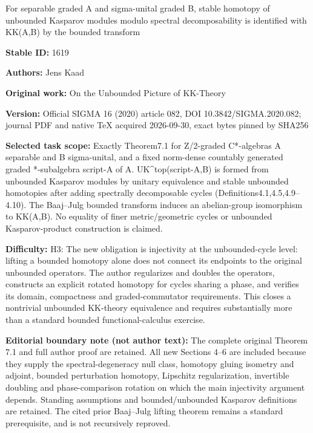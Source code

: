 \documentclass[11pt]{article}
\numberwithin{equation}{section}
\begin{document}
\begin{center}\Large For separable graded A and sigma-unital graded B, stable homotopy of unbounded Kasparov modules modulo spectral decomposability is identified with KK(A,B) by the bounded transform\end{center}
\noindent\textbf{Stable ID:} 1619\par
\noindent\textbf{Authors:} Jens Kaad\par
\noindent\textbf{Original work:} On the Unbounded Picture of KK-Theory\par
\noindent\textbf{Version:} Official SIGMA 16 (2020) article 082, DOI 10.3842/SIGMA.2020.082; journal PDF and native TeX acquired 2026-09-30, exact bytes pinned by SHA256\par
\noindent\textbf{Selected task scope:} Exactly Theorem7.1 for Z/2-graded C*-algebras A separable and B sigma-unital, and a fixed norm-dense countably generated graded *-subalgebra script-A of A. UK\textasciicircum{}top(script-A,B) is formed from unbounded Kasparov modules by unitary equivalence and stable unbounded homotopies after adding spectrally decomposable cycles (Definitions4.1,4.5,4.9–4.10). The Baaj–Julg bounded transform induces an abelian-group isomorphism to KK(A,B). No equality of finer metric/geometric cycles or unbounded Kasparov-product construction is claimed.\par
\noindent\textbf{Difficulty:} H3: The new obligation is injectivity at the unbounded-cycle level: lifting a bounded homotopy alone does not connect its endpoints to the original unbounded operators. The author regularizes and doubles the operators, constructs an explicit rotated homotopy for cycles sharing a phase, and verifies its domain, compactness and graded-commutator requirements. This closes a nontrivial unbounded KK-theory equivalence and requires substantially more than a standard bounded functional-calculus exercise.\par
\noindent\textbf{Editorial boundary note (not author text):} The complete original Theorem 7.1 and full author proof are retained. All new Sections 4–6 are included because they supply the spectral-degeneracy null class, homotopy gluing isometry and adjoint, bounded perturbation homotopy, Lipschitz regularization, invertible doubling and phase-comparison rotation on which the main injectivity argument depends. Standing assumptions and bounded/unbounded Kasparov definitions are retained. The cited prior Baaj–Julg lifting theorem remains a standard prerequisite, and is not recursively reproved.\par
\end{document}
